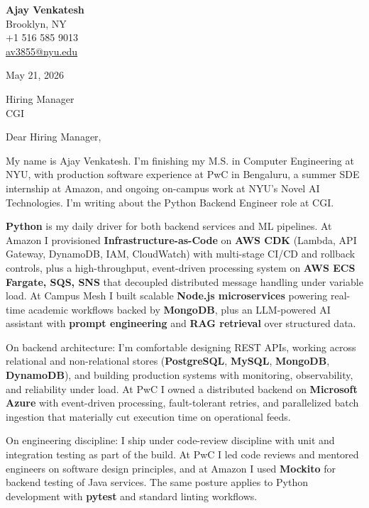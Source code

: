 \documentclass[letterpaper,11pt]{article}
\begin{document}
\begin{flushleft}
\textbf{\large Ajay Venkatesh} \\
Brooklyn, NY \\
+1 516 585 9013 \\
\href{mailto:av3855@nyu.edu}{av3855@nyu.edu}
\end{flushleft}
\vspace{10pt}
May 21, 2026
\vspace{6pt}

Hiring Manager \\
CGI

\vspace{10pt}

Dear Hiring Manager,

My name is Ajay Venkatesh. I'm finishing my M.S. in Computer Engineering at NYU, with production software experience at PwC in Bengaluru, a summer SDE internship at Amazon, and ongoing on-campus work at NYU's Novel AI Technologies. I'm writing about the Python Backend Engineer role at CGI.

\textbf{Python} is my daily driver for both backend services and ML pipelines. At Amazon I provisioned \textbf{Infrastructure-as-Code} on \textbf{AWS CDK} (Lambda, API Gateway, DynamoDB, IAM, CloudWatch) with multi-stage CI/CD and rollback controls, plus a high-throughput, event-driven processing system on \textbf{AWS ECS Fargate, SQS, SNS} that decoupled distributed message handling under variable load. At Campus Mesh I built scalable \textbf{Node.js microservices} powering real-time academic workflows backed by \textbf{MongoDB}, plus an LLM-powered AI assistant with \textbf{prompt engineering} and \textbf{RAG retrieval} over structured data.

On backend architecture: I'm comfortable designing REST APIs, working across relational and non-relational stores (\textbf{PostgreSQL}, \textbf{MySQL}, \textbf{MongoDB}, \textbf{DynamoDB}), and building production systems with monitoring, observability, and reliability under load. At PwC I owned a distributed backend on \textbf{Microsoft Azure} with event-driven processing, fault-tolerant retries, and parallelized batch ingestion that materially cut execution time on operational feeds.

On engineering discipline: I ship under code-review discipline with unit and integration testing as part of the build. At PwC I led code reviews and mentored engineers on software design principles, and at Amazon I used \textbf{Mockito} for backend testing of Java services. The same posture applies to Python development with \textbf{pytest} and standard linting workflows.
\end{document}
